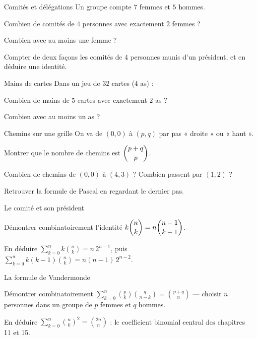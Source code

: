 \begin{exercice}[2]{Comités et délégations}
Un groupe compte $7$ femmes et $5$ hommes.
\begin{questions}
  \item Combien de comités de $4$ personnes avec exactement $2$ femmes ?
  \item Combien avec au moins une femme ?
  \item Compter de deux façons les comités de $4$ personnes munis d'un
    président, et en déduire une identité.
\end{questions}
\end{exercice}

\begin{exercice}[2]{Mains de cartes}
Dans un jeu de $32$ cartes ($4$ as) :
\begin{questions}
  \item Combien de mains de $5$ cartes avec exactement $2$ as ?
  \item Combien avec au moins un as ?
\end{questions}
\end{exercice}

\begin{exercice}[2]{Chemins sur une grille}
On va de $(0,0)$ à $(p,q)$ par pas « droite » ou « haut ».
\begin{questions}
  \item Montrer que le nombre de chemins est $\dbinom{p+q}{p}$.
  \item Combien de chemins de $(0,0)$ à $(4,3)$ ? Combien passent par
    $(1,2)$ ?
  \item Retrouver la formule de Pascal en regardant le dernier pas.
\end{questions}
\end{exercice}

\begin{exercice}[2]{Le comité et son président}
\begin{questions}
  \item Démontrer combinatoirement l'identité
    $k\dbinom nk=n\dbinom{n-1}{k-1}$.
  \item En déduire $\displaystyle\sum_{k=0}^{n}k\binom nk=n\,2^{n-1}$,
    puis $\displaystyle\sum_{k=0}^{n}k(k-1)\binom nk=n(n-1)\,2^{n-2}$.
\end{questions}
\end{exercice}

\begin{exercice}[2]{La formule de Vandermonde}
\begin{questions}
  \item Démontrer combinatoirement
    $\displaystyle\sum_{k=0}^{n}\binom pk\binom{q}{n-k}=\binom{p+q}{n}$
    — choisir $n$ personnes dans un groupe de $p$ femmes et $q$ hommes.
  \item En déduire
    $\displaystyle\sum_{k=0}^{n}\binom nk^{2}=\binom{2n}{n}$ : le
    coefficient binomial central des chapitres 11 et 15.
\end{questions}
\end{exercice}

